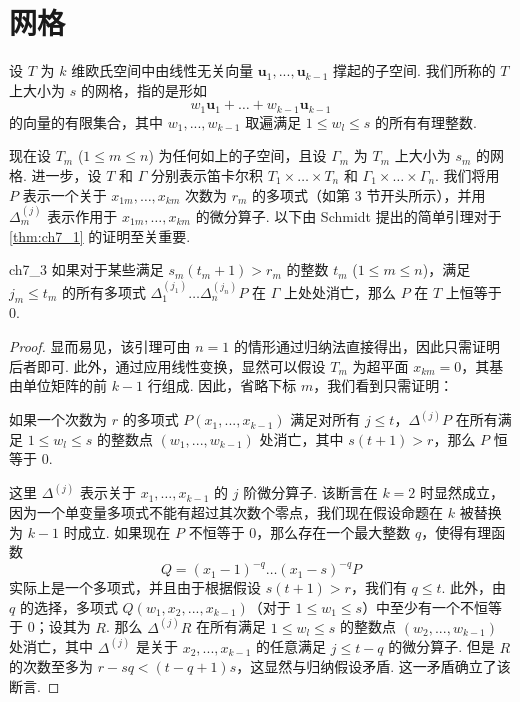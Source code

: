 \section{网格}\label{sec:ch7_5}

设 $T$ 为 $k$ 维欧氏空间中由线性无关向量 $\mathbf{u}_1, ..., \mathbf{u}_{k-1}$ 撑起的子空间. 我们所称的 $T$ 上大小为 $s$ 的网格，指的是形如
\[w_1\mathbf{u}_1+\ldots+w_{k-1}\mathbf{u}_{k-1}\]
的向量的有限集合，其中 $w_1, ..., w_{k-1}$ 取遍满足 $1 \le w_l \le s$ 的所有有理整数.

现在设 $T_m$ ($1 \le m \le n$) 为任何如上的子空间，且设 $\Gamma_m$ 为 $T_m$ 上大小为 $s_m$ 的网格. 进一步，设 $T$ 和 $\Gamma$ 分别表示笛卡尔积 $T_1 \times \ldots \times T_n$ 和 $\Gamma_1 \times \ldots \times \Gamma_n$. 我们将用 $P$ 表示一个关于 $x_{1m}, \ldots, x_{km}$ 次数为 $r_m$ 的多项式（如第 3 节开头所示），并用 $\Delta_m^{(j)}$ 表示作用于 $x_{1m}, \ldots, x_{km}$ 的微分算子. 以下由 Schmidt 提出的简单引理对于 \autoref{thm:ch7_1} 的证明至关重要.

\begin{mylemma}{}{ch7_3}
如果对于某些满足 $s_m(t_m+1) > r_m$ 的整数 $t_m$ ($1 \le m \le n$)，满足 $j_m \le t_m$ 的所有多项式 $\Delta_1^{(j_1)} \dots \Delta_n^{(j_n)} P$ 在 $\Gamma$ 上处处消亡，那么 $P$ 在 $T$ 上恒等于 0.
\end{mylemma}

\begin{proof}
显而易见，该引理可由 $n=1$ 的情形通过归纳法直接得出，因此只需证明后者即可. 此外，通过应用线性变换，显然可以假设 $T_m$ 为超平面 $x_{km}=0$，其基由单位矩阵的前 $k-1$ 行组成. 因此，省略下标 $m$，我们看到只需证明：

如果一个次数为 $r$ 的多项式 $P(x_1, ..., x_{k-1})$ 满足对所有 $j \le t$，$\Delta^{(j)}P$ 在所有满足 $1 \leq w_l \leq s$ 的整数点 $(w_1, ..., w_{k-1})$ 处消亡，其中 $s(t+1) > r$，那么 $P$ 恒等于 0.

这里 $\Delta^{(j)}$ 表示关于 $x_1, \ldots, x_{k-1}$ 的 $j$ 阶微分算子. 该断言在 $k=2$ 时显然成立，因为一个单变量多项式不能有超过其次数个零点，我们现在假设命题在 $k$ 被替换为 $k-1$ 时成立. 如果现在 $P$ 不恒等于 0，那么存在一个最大整数 $q$，使得有理函数
\[ Q = (x_1 - 1)^{-q} \dots (x_1 - s)^{-q} P \]
实际上是一个多项式，并且由于根据假设 $s(t+1) > r$，我们有 $q \le t$. 此外，由 $q$ 的选择，多项式 $Q(w_1, x_2, ..., x_{k-1})$（对于 $1 \le w_1 \le s$）中至少有一个不恒等于 0；设其为 $R$. 那么 $\Delta^{(j)}R$ 在所有满足 $1 \le w_l \le s$ 的整数点 $(w_2, ..., w_{k-1})$ 处消亡，其中 $\Delta^{(j)}$ 是关于 $x_2, ..., x_{k-1}$ 的任意满足 $j \le t-q$ 的微分算子. 但是 $R$ 的次数至多为 $r-sq < (t-q+1)s$，这显然与归纳假设矛盾. 这一矛盾确立了该断言.
\end{proof}

